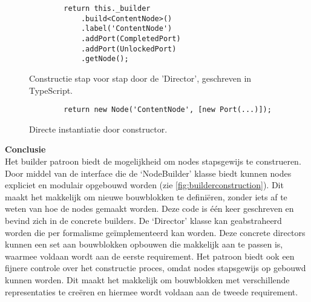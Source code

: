\begin{figure}[htb]
    \centering
    \lstset{language=JavaScript}
    \begin{lstlisting}
        return this._builder
            .build<ContentNode>()
            .label('ContentNode')
            .addPort(CompletedPort)
            .addPort(UnlockedPort)
            .getNode();
    \end{lstlisting}
    \caption{Constructie stap voor stap door de 'Director', geschreven in TypeScript.}
    \label{fig:builderconstruction}
\end{figure}

\begin{figure}[htb]
    \centering
    \lstset{language=JavaScript}
    \begin{lstlisting}
        return new Node('ContentNode', [new Port(...)]);
    \end{lstlisting}
    \caption{Directe instantiatie door constructor.}
    \label{fig:constructionbyconstructor}
\end{figure}

\noindent\textbf{Conclusie}\\
Het builder patroon biedt de mogelijkheid om nodes stapsgewijs te construeren. Door middel van de interface die de ‘NodeBuilder’ klasse biedt kunnen nodes expliciet en modulair opgebouwd worden (zie \autoref{fig:builderconstruction}). Dit maakt het makkelijk om nieuwe bouwblokken te definiëren, zonder iets af te weten van hoe de nodes gemaakt worden. Deze code is één keer geschreven en bevind zich in de concrete builders. De ‘Director’ klasse kan geabstraheerd worden die per formalisme geïmplementeerd kan worden. Deze concrete directors kunnen een set aan bouwblokken opbouwen die makkelijk aan te passen is, waarmee voldaan wordt aan de eerste requirement. Het patroon biedt ook een fijnere controle over het constructie proces, omdat nodes stapsgewijs op gebouwd kunnen worden. Dit maakt het makkelijk om bouwblokken met verschillende representaties te creëren en hiermee wordt voldaan aan de tweede requirement.

               
